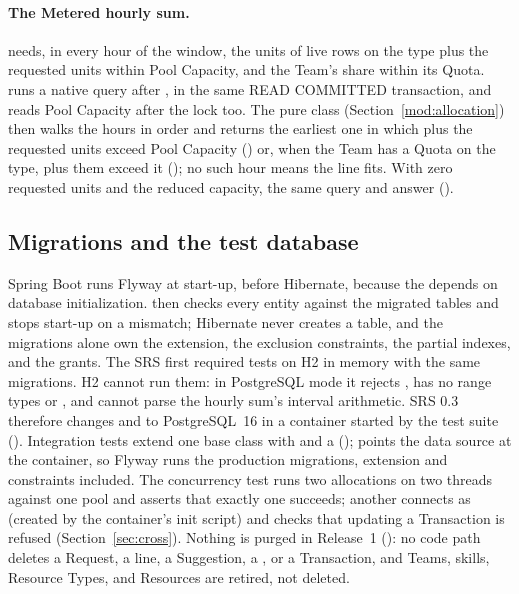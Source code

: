 \paragraph{The Metered hourly sum.}  needs, in every hour of the window, the units of live rows on the type plus the requested units within Pool Capacity, and the Team's share within its Quota.  runs a native query after , in the same READ COMMITTED transaction, and reads Pool Capacity after the lock too. The pure class  (Section~\ref{mod:allocation}) then walks the hours in order and returns the earliest one in which  plus the requested units exceed Pool Capacity () or, when the Team has a Quota on the type,  plus them exceed it (); no such hour means the line fits. With zero requested units and the reduced capacity, the same query and  answer  ().


\subsection{Migrations and the test database}

Spring Boot runs Flyway at start-up, before Hibernate, because the  depends on database initialization.  then checks every entity against the migrated tables and stops start-up on a mismatch; Hibernate never creates a table, and the migrations alone own the extension, the exclusion constraints, the partial indexes, and the grants. The SRS first required tests on H2 in memory with the same migrations. H2 cannot run them: in PostgreSQL mode it rejects , has no range types or , and cannot parse the hourly sum's interval arithmetic. SRS 0.3 therefore changes  and  to PostgreSQL~16 in a container started by the test suite (). Integration tests extend one base class with  and a  ();  points the data source at the container, so Flyway runs the production migrations, extension and constraints included. The concurrency test runs two allocations on two threads against one pool and asserts that exactly one succeeds; another connects as  (created by the container's init script) and checks that updating a Transaction is refused (Section~\ref{sec:cross}). Nothing is purged in Release~1 (): no code path deletes a Request, a line, a Suggestion, a , or a Transaction, and Teams, skills, Resource Types, and Resources are retired, not deleted.
\endgroup
